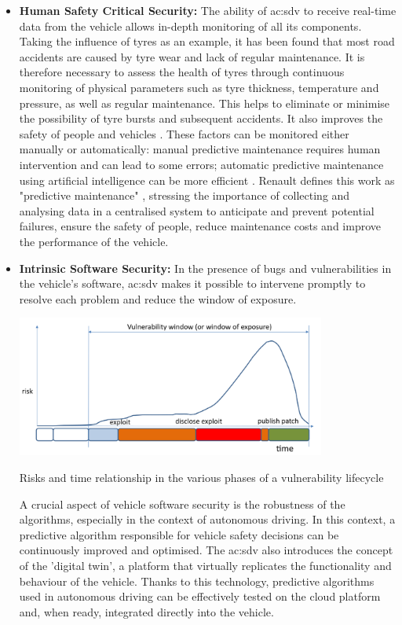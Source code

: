 \begin{itemize}
    \item \textbf{Human Safety Critical Security:} The ability of \gls{ac:sdv} to receive real-time data from the vehicle allows in-depth monitoring of all its components. Taking the influence of tyres as an example, it has been found that most road accidents are caused by tyre wear and lack of regular maintenance. It is therefore necessary to assess the health of tyres through continuous monitoring of physical parameters such as tyre thickness, temperature and pressure, as well as regular maintenance. This helps to eliminate or minimise the possibility of tyre bursts and subsequent accidents. It also improves the safety of people and vehicles \cite{PredictDefectsOfTiresInHeavyVehicle}. These factors can be monitored either manually or automatically: manual predictive maintenance requires human intervention and can lead to some errors; automatic predictive maintenance using artificial intelligence can be more efficient \cite{AirPressureSystemFailurePrediction}. Renault defines this work as "predictive maintenance" \cite{SDVRenault}, stressing the importance of collecting and analysing data in a centralised system to anticipate and prevent potential failures, ensure the safety of people, reduce maintenance costs and improve the performance of the vehicle.
    \item \textbf{Intrinsic Software Security:} In the presence of bugs and vulnerabilities in the vehicle's software, \gls{ac:sdv} makes it possible to intervene promptly to resolve each problem and reduce the window of exposure.
    \begin{table}[h]  %
        \centering
        \includegraphics[width=0.8\textwidth]{images/window_of_exposure.png}  %
        \caption{Risks and time relationship in the various phases of a vulnerability lifecycle}
        \label{tab:WindowOfExposure}
    \end{table}

    A crucial aspect of vehicle software security is the robustness of the algorithms, especially in the context of autonomous driving. In this context, a predictive algorithm responsible for vehicle safety decisions can be continuously improved and optimised. The \gls{ac:sdv} also introduces the concept of the 'digital twin', a platform that virtually replicates the functionality and behaviour of the vehicle. Thanks to this technology, predictive algorithms used in autonomous driving can be effectively tested on the cloud platform and, when ready, integrated directly into the vehicle.
\end{itemize}

